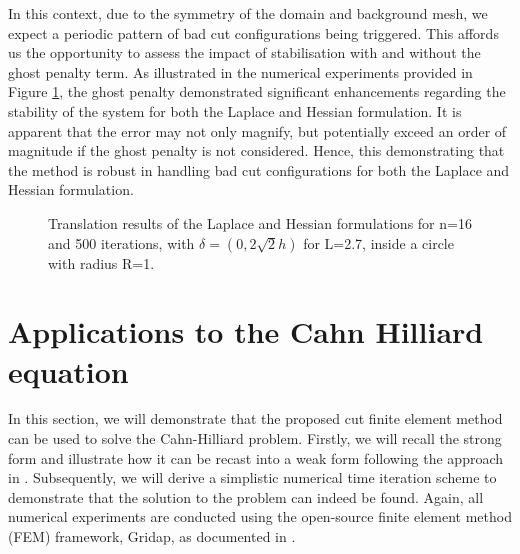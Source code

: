 \documentclass[11pt]{article}
\theoremstyle{remark}
\numberwithin{equation}{section}
\begin{document}
In this context, due to the symmetry of the domain and background mesh, we expect a periodic pattern of bad cut configurations being triggered. This affords us the opportunity to assess the impact of stabilisation with and without the ghost penalty
term. As illustrated in the numerical experiments provided in Figure \ref{fig:trans_lap_hes}, the ghost penalty demonstrated significant enhancements regarding the stability of the system for both the Laplace and Hessian
formulation. It is apparent that the error may not only magnify, but potentially exceed an order of magnitude if the ghost penalty is not considered. Hence, this demonstrating that the method is robust in handling bad cut configurations for both the Laplace and Hessian formulation.



\begin{figure}[h!]
\centering

\subfloat[Hessian]{%

}

\subfloat[Hessian]{%

}

\vspace{10pt}



\subfloat[Laplace ]{%

}

\subfloat[Laplace ]{%

}


\caption{Translation results of the Laplace and Hessian formulations for n=16 and 500 iterations, with $\delta = ( 0, 2\sqrt{2}h) $  for L=2.7, inside a circle with radius R=1.}

\label{fig:trans_lap_hes}
\end{figure}


\newpage
\section{Applications to the Cahn Hilliard equation }%
\label{sec:cahn_hilliar_applications}

In this section, we will demonstrate that the proposed cut finite element method can be used to solve the Cahn-Hilliard problem. Firstly, we will recall the strong form and illustrate how it can be recast into a weak form following the approach in
\cite{feng2007fully}. Subsequently, we will derive a simplistic numerical time iteration scheme to demonstrate that the solution to the problem can indeed be found. Again, all numerical experiments are conducted using the open-source finite element method (FEM) framework, Gridap, as documented in \cite{verdugo22}.
\end{document}
